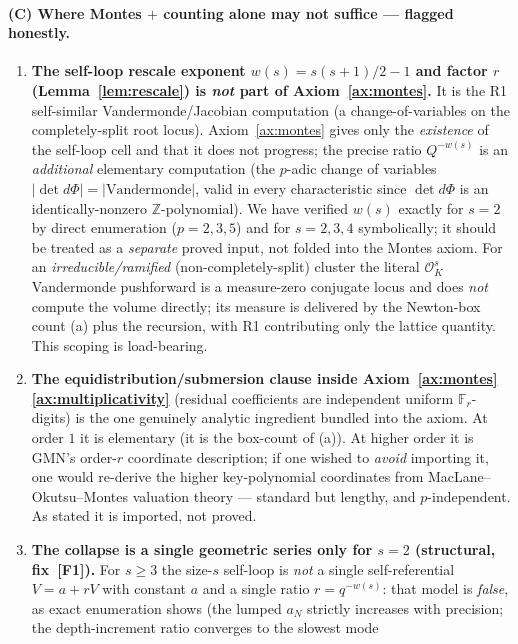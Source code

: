 \documentclass[11pt]{article}
\theoremstyle{definition}
\theoremstyle{remark}
\newcommand{\OK}{\mathcal{O}_K}
\newcommand{\Fr}{\mathbb{F}_r}
\begin{document}
\paragraph{(C) Where Montes $+$ counting alone may not suffice --- flagged honestly.}
\begin{enumerate}[label=(C\arabic*),nosep]
\item\textbf{The self-loop rescale exponent $w(s)=s(s+1)/2-1$ and factor $r$
(Lemma~\ref{lem:rescale}) is \emph{not} part of Axiom~\ref{ax:montes}.} It is the
R1 self-similar Vandermonde/Jacobian computation (a change-of-variables on the
completely-split root locus). Axiom~\ref{ax:montes} gives only the
\emph{existence} of the self-loop cell and that it does not progress; the precise
ratio $Q^{-w(s)}$ is an \emph{additional} elementary computation (the $p$-adic
change of variables $|\!\det d\Phi|=|\mathrm{Vandermonde}|$, valid in every
characteristic since $\det d\Phi$ is an identically-nonzero $\mathbb Z$-polynomial).
We have verified $w(s)$ exactly for $s=2$ by direct enumeration ($p=2,3,5$) and
for $s=2,3,4$ symbolically; it should be treated as a \emph{separate} proved
input, not folded into the Montes axiom. For an \emph{irreducible/ramified}
(non-completely-split) cluster the literal $\OK^s$ Vandermonde pushforward is a
measure-zero conjugate locus and does \emph{not} compute the volume directly; its
measure is delivered by the Newton-box count (a) plus the recursion, with R1
contributing only the lattice quantity. This scoping is load-bearing.
\item\textbf{The equidistribution/submersion clause inside
Axiom~\ref{ax:montes}\ref{ax:multiplicativity}} (residual coefficients are
independent uniform $\Fr$-digits) is the one genuinely analytic ingredient bundled
into the axiom. At order $1$ it is elementary (it is the box-count of (a)). At
higher order it is GMN's order-$r$ coordinate description; if one wished to
\emph{avoid} importing it, one would re-derive the higher key-polynomial
coordinates from MacLane--Okutsu--Montes valuation theory --- standard but
lengthy, and $p$-independent. As stated it is imported, not proved.
\item\textbf{The collapse is a single geometric series only for $s=2$
(structural, fix~[F1]).} For $s\ge3$ the size-$s$ self-loop is \emph{not} a single
self-referential $V=a+rV$ with constant $a$ and a single ratio $r=q^{-w(s)}$: that
model is \emph{false}, as exact enumeration shows (the lumped $a_N$ strictly
increases with precision; the depth-increment ratio converges to the slowest mode

\end{enumerate}
\end{document}
